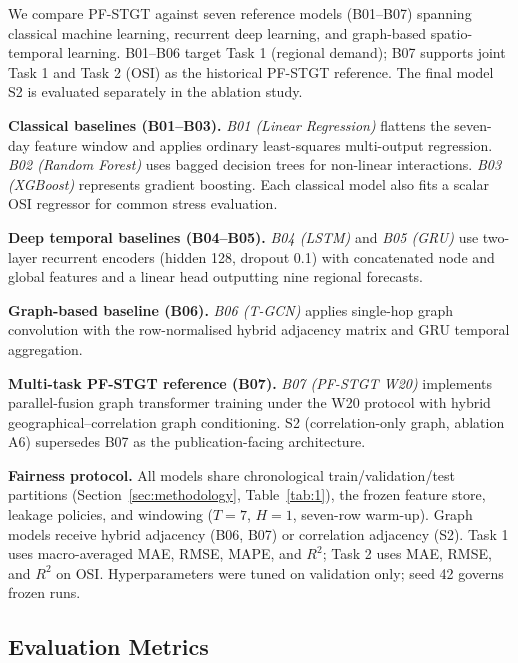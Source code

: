 We compare PF-STGT against seven reference models (B01--B07) \cite{Breiman2001RandomForest,Chen2016XGBoost,Hochreiter1997LSTM,Cho2014GRU,Zhao2020TGCN} spanning classical machine learning, recurrent deep learning, and graph-based spatio-temporal learning. B01--B06 target Task 1 (regional demand); B07 supports joint Task 1 and Task 2 (OSI) as the historical PF-STGT reference. The final model S2 is evaluated separately in the ablation study.

\textbf{Classical baselines (B01--B03).} \textit{B01 (Linear Regression)} flattens the seven-day feature window and applies ordinary least-squares multi-output regression. \textit{B02 (Random Forest)} \cite{Breiman2001RandomForest} uses bagged decision trees for non-linear interactions. \textit{B03 (XGBoost)} \cite{Chen2016XGBoost} represents gradient boosting. Each classical model also fits a scalar OSI regressor for common stress evaluation.

\textbf{Deep temporal baselines (B04--B05).} \textit{B04 (LSTM)} \cite{Hochreiter1997LSTM} and \textit{B05 (GRU)} \cite{Cho2014GRU} use two-layer recurrent encoders (hidden 128, dropout 0.1) with concatenated node and global features and a linear head outputting nine regional forecasts.

\textbf{Graph-based baseline (B06).} \textit{B06 (T-GCN)} \cite{Zhao2020TGCN} applies single-hop graph convolution with the row-normalised hybrid adjacency matrix and GRU temporal aggregation.

\textbf{Multi-task PF-STGT reference (B07).} \textit{B07 (PF-STGT W20)} implements parallel-fusion graph transformer training under the W20 protocol with hybrid geographical--correlation graph conditioning. S2 (correlation-only graph, ablation A6) supersedes B07 as the publication-facing architecture.

\textbf{Fairness protocol.} All models share chronological train/validation/test partitions (Section~\ref{sec:methodology}, Table~\ref{tab:1}), the frozen feature store, leakage policies, and windowing (\(T = 7\), \(H = 1\), seven-row warm-up). Graph models receive hybrid adjacency (B06, B07) or correlation adjacency (S2). Task 1 uses macro-averaged MAE, RMSE, MAPE, and $R^2$; Task 2 uses MAE, RMSE, and $R^2$ on OSI. Hyperparameters were tuned on validation only; seed 42 governs frozen runs.

\subsection{Evaluation Metrics}\label{subsection:evaluation_metrics}

